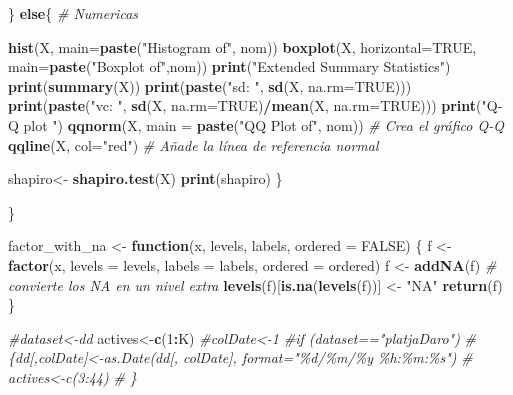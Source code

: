 \documentclass[
]{article}
\newenvironment{Shaded}{\begin{snugshade}}{\end{snugshade}}
\newcommand{\AttributeTok}[1]{\textcolor[rgb]{0.13,0.29,0.53}{#1}}
\newcommand{\CommentTok}[1]{\textcolor[rgb]{0.56,0.35,0.01}{\textit{#1}}}
\newcommand{\ConstantTok}[1]{\textcolor[rgb]{0.56,0.35,0.01}{#1}}
\newcommand{\ControlFlowTok}[1]{\textcolor[rgb]{0.13,0.29,0.53}{\textbf{#1}}}
\newcommand{\DecValTok}[1]{\textcolor[rgb]{0.00,0.00,0.81}{#1}}
\newcommand{\FunctionTok}[1]{\textcolor[rgb]{0.13,0.29,0.53}{\textbf{#1}}}
\newcommand{\NormalTok}[1]{#1}
\newcommand{\OtherTok}[1]{\textcolor[rgb]{0.56,0.35,0.01}{#1}}
\newcommand{\SpecialCharTok}[1]{\textcolor[rgb]{0.81,0.36,0.00}{\textbf{#1}}}
\newcommand{\StringTok}[1]{\textcolor[rgb]{0.31,0.60,0.02}{#1}}
\begin{document}
\begin{Shaded}
\begin{Highlighting}[]
\NormalTok{   \}}
  \ControlFlowTok{else}\NormalTok{\{}
       \CommentTok{\# Numericas}
       
       \FunctionTok{hist}\NormalTok{(X, }\AttributeTok{main=}\FunctionTok{paste}\NormalTok{(}\StringTok{"Histogram of"}\NormalTok{, nom))}
       \FunctionTok{boxplot}\NormalTok{(X, }\AttributeTok{horizontal=}\ConstantTok{TRUE}\NormalTok{, }\AttributeTok{main=}\FunctionTok{paste}\NormalTok{(}\StringTok{"Boxplot of"}\NormalTok{,nom))}
       \FunctionTok{print}\NormalTok{(}\StringTok{"Extended Summary Statistics"}\NormalTok{)}
       \FunctionTok{print}\NormalTok{(}\FunctionTok{summary}\NormalTok{(X))}
       \FunctionTok{print}\NormalTok{(}\FunctionTok{paste}\NormalTok{(}\StringTok{"sd: "}\NormalTok{, }\FunctionTok{sd}\NormalTok{(X, }\AttributeTok{na.rm=}\ConstantTok{TRUE}\NormalTok{)))}
       \FunctionTok{print}\NormalTok{(}\FunctionTok{paste}\NormalTok{(}\StringTok{"vc: "}\NormalTok{, }\FunctionTok{sd}\NormalTok{(X, }\AttributeTok{na.rm=}\ConstantTok{TRUE}\NormalTok{)}\SpecialCharTok{/}\FunctionTok{mean}\NormalTok{(X, }\AttributeTok{na.rm=}\ConstantTok{TRUE}\NormalTok{)))}
       \FunctionTok{print}\NormalTok{(}\StringTok{"Q{-}Q plot "}\NormalTok{)}
      \FunctionTok{qqnorm}\NormalTok{(X, }\AttributeTok{main =} \FunctionTok{paste}\NormalTok{(}\StringTok{"QQ Plot of"}\NormalTok{, nom)) }\CommentTok{\# Crea el gráfico Q{-}Q}
      \FunctionTok{qqline}\NormalTok{(X, }\AttributeTok{col=}\StringTok{"red"}\NormalTok{) }\CommentTok{\# Añade la línea de referencia normal}

\NormalTok{      shapiro}\OtherTok{\textless{}{-}} \FunctionTok{shapiro.test}\NormalTok{(X)}
      \FunctionTok{print}\NormalTok{(shapiro)}
\NormalTok{  \}}
   
\NormalTok{\}}

\NormalTok{factor\_with\_na }\OtherTok{\textless{}{-}} \ControlFlowTok{function}\NormalTok{(x, levels, labels, }\AttributeTok{ordered =} \ConstantTok{FALSE}\NormalTok{) \{}
\NormalTok{  f }\OtherTok{\textless{}{-}} \FunctionTok{factor}\NormalTok{(x, }\AttributeTok{levels =}\NormalTok{ levels, }\AttributeTok{labels =}\NormalTok{ labels, }\AttributeTok{ordered =}\NormalTok{ ordered)}
\NormalTok{  f }\OtherTok{\textless{}{-}} \FunctionTok{addNA}\NormalTok{(f)   }\CommentTok{\# convierte los NA en un nivel extra}
  \FunctionTok{levels}\NormalTok{(f)[}\FunctionTok{is.na}\NormalTok{(}\FunctionTok{levels}\NormalTok{(f))] }\OtherTok{\textless{}{-}} \StringTok{"NA"}
  \FunctionTok{return}\NormalTok{(f)}
\NormalTok{\}}

\CommentTok{\#dataset\textless{}{-}dd}
\NormalTok{actives}\OtherTok{\textless{}{-}}\FunctionTok{c}\NormalTok{(}\DecValTok{1}\SpecialCharTok{:}\NormalTok{K)}
\CommentTok{\#colDate\textless{}{-}1}
\CommentTok{\#if (dataset=="platjaDaro")}
\CommentTok{\#  \{dd[,colDate]\textless{}{-}as.Date(dd[, colDate], format="\%d/\%m/\%y \%h:\%m:\%s")}
\CommentTok{\#   actives\textless{}{-}c(3:44)}
\CommentTok{\#   \}}
\end{Highlighting}
\end{Shaded}
\end{document}
